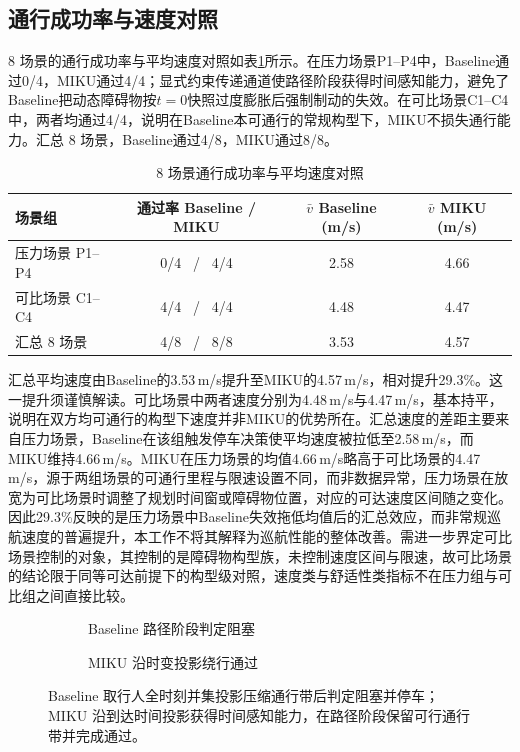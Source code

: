 \documentclass[a4paper,11pt]{ctexart}
\providecommand{\datapath}{../../图片/data/01_crossing_ped/}
\theoremstyle{definition}
\begin{document}
\subsection{通行成功率与速度对照}
\label{subsec:exp_passrate}

8 场景的通行成功率与平均速度对照如表\ref{tab:exp_pass}所示。在压力场景P1--P4中，Baseline通过0/4，MIKU通过4/4；显式约束传递通道使路径阶段获得时间感知能力，避免了Baseline把动态障碍物按$t=0$快照过度膨胀后强制制动的失效。在可比场景C1--C4中，两者均通过4/4，说明在Baseline本可通行的常规构型下，MIKU不损失通行能力。汇总 8 场景，Baseline通过4/8，MIKU通过8/8。

\begin{table}[htbp]
\centering
\caption{8 场景通行成功率与平均速度对照}
\label{tab:exp_pass}
\small
\begin{tabular}{lccc}
\toprule
\textbf{场景组} & \textbf{通过率 Baseline / MIKU} & \textbf{$\bar v$ Baseline (m/s)} & \textbf{$\bar v$ MIKU (m/s)} \\
\midrule
压力场景 P1--P4 & 0/4 \ / \ 4/4 & 2.58 & 4.66 \\
可比场景 C1--C4 & 4/4 \ / \ 4/4 & 4.48 & 4.47 \\
\midrule
汇总 8 场景 & 4/8 \ / \ 8/8 & 3.53 & 4.57 \\
\bottomrule
\end{tabular}
\end{table}

汇总平均速度由Baseline的3.53\,m/s提升至MIKU的4.57\,m/s，相对提升29.3\%。这一提升须谨慎解读。可比场景中两者速度分别为4.48\,m/s与4.47\,m/s，基本持平，说明在双方均可通行的构型下速度并非MIKU的优势所在。汇总速度的差距主要来自压力场景，Baseline在该组触发停车决策使平均速度被拉低至2.58\,m/s，而MIKU维持4.66\,m/s。MIKU在压力场景的均值4.66\,m/s略高于可比场景的4.47\,m/s，源于两组场景的可通行里程与限速设置不同，而非数据异常，压力场景在放宽为可比场景时调整了规划时间窗或障碍物位置，对应的可达速度区间随之变化。因此29.3\%反映的是压力场景中Baseline失效拖低均值后的汇总效应，而非常规巡航速度的普遍提升，本工作不将其解释为巡航性能的整体改善。需进一步界定可比场景控制的对象，其控制的是障碍物构型族，未控制速度区间与限速，故可比场景的结论限于同等可达前提下的构型级对照，速度类与舒适性类指标不在压力组与可比组之间直接比较。

\begin{figure}[htbp]
\centering
\begingroup
\renewcommand{\datapath}{../../图片/data/01_crossing_ped/}
\begin{subfigure}[b]{0.46\textwidth}
  \centering
  \caption{Baseline 路径阶段判定阻塞}
\end{subfigure}\hfill
\begin{subfigure}[b]{0.46\textwidth}
  \centering
  \caption{MIKU 沿时变投影绕行通过}
\end{subfigure}
\endgroup
\caption{压力场景 P1 单行人横穿的 SL 路径边界对照}
\caption*{Baseline 取行人全时刻并集投影压缩通行带后判定阻塞并停车；MIKU 沿到达时间投影获得时间感知能力，在路径阶段保留可行通行带并完成通过。}
\label{fig:exp_p1_sl}
\end{figure}
\end{document}
